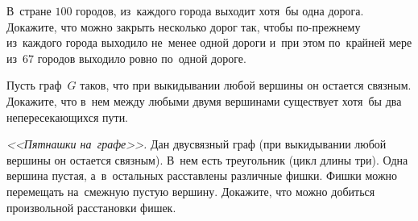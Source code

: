 \begin{problems}
\item
В~стране $100$ городов, из~каждого города выходит хотя~бы одна дорога.
Докажите, что можно закрыть несколько дорог так, чтобы по-прежнему из~каждого
города выходило не~менее одной дороги и~при этом по~крайней мере
из~$67$ городов выходило ровно по~одной дороге.

\item
Пусть граф~$G$ таков, что при выкидывании любой вершины он остается связным.
Докажите, что в~нем между любыми двумя вершинами существует хотя~бы два
непересекающихся пути.

\item
\emph{<<Пятнашки на~графе>>.}
Дан двусвязный граф (при выкидывании любой вершины он остается связным).
В~нем есть треугольник (цикл длины три).
Одна вершина пустая, а~в~остальных расставлены различные фишки.
Фишки можно перемещать на~смежную пустую вершину.
Докажите, что можно добиться произвольной расстановки фишек.

\end{problems}

